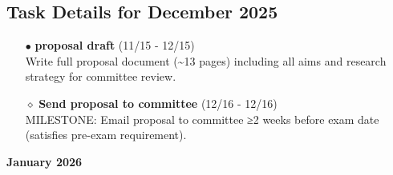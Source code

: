 \documentclass[landscape,a4paper]{article}
\begin{document}
\subsection{Task Details for December 2025}
\begin{itemize}[leftmargin=1cm]
    \item[\textcolor{researchcore}{$\bullet$}] \textbf{proposal draft} (11/15 - 12/15)\\ Write full proposal document (\textasciitilde{}13 pages) including all aims and research strategy for committee review.
    \item[\textcolor{researchcore}{$\diamond$}] \textbf{Send proposal to committee} (12/16 - 12/16)\\ MILESTONE: Email proposal to committee ≥2 weeks before exam date (satisfies pre-exam requirement).
\end{itemize}

\newpage
\pagestyle{empty}

\begin{center}
{\large\textbf{January 2026}}
\end{center}

\vspace{0.5cm}
\end{document}
